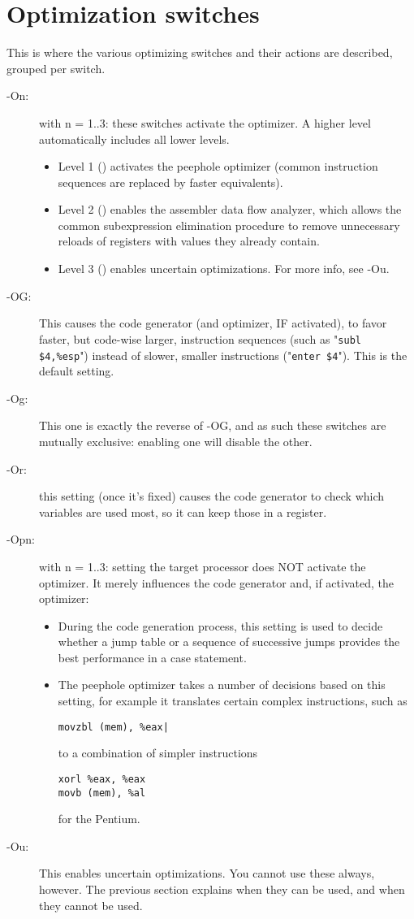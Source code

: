 \documentclass{report}
\begin{document}
\section{Optimization switches}
This is where the various optimizing switches and their actions are 
described, grouped per switch.

\begin{description}
\item [-On:\ ] with n = 1..3: these switches activate the optimizer. 
A higher level automatically includes all lower levels.
\begin{itemize}	
\item Level 1 () activates the peephole optimizer 
 (common instruction sequences are replaced by faster equivalents).
\item Level 2 () enables the assembler data flow analyzer, 
which allows the common subexpression elimination procedure to 
remove unnecessary reloads of registers with values they already contain.
\item Level 3 () enables uncertain optimizations. For more info, see -Ou.
\end{itemize}
\item[-OG:\ ] 
This causes the code generator (and optimizer, IF activated), to favor 
faster, but code-wise larger, instruction sequences (such as 
"\verb|subl $4,%esp|") instead of slower, smaller instructions 
("\verb|enter $4|").  This is the default setting.

\item[-Og:\ ] This one is exactly the reverse of -OG, and as such these 
switches are mutually exclusive: enabling one will disable the other.

\item[-Or:\ ] this setting (once it's fixed) causes the code generator to 
check which variables are used most, so it can keep those in a register.

\item[-Opn:\ ] with n = 1..3: setting the target processor does NOT 
activate the optimizer. It merely influences the code generator and, 
if activated, the optimizer:
\begin{itemize}
\item During the code generation process, this setting is used to 
decide whether a jump table or a sequence of successive jumps provides 
the best performance in a case statement.
\item The peephole optimizer takes a number of decisions based on this 
setting, for example it translates certain complex instructions, such 
as 
\begin{verbatim}
movzbl (mem), %eax|
\end{verbatim}
to a combination of simpler instructions 
\begin{verbatim}
xorl %eax, %eax
movb (mem), %al
\end{verbatim}
for the Pentium.
\end{itemize}
\item[-Ou:\ ] This enables uncertain optimizations. You cannot use these
always, however. The previous section explains when they can be used, and
when they cannot be used.
\end{description}
\end{document}
